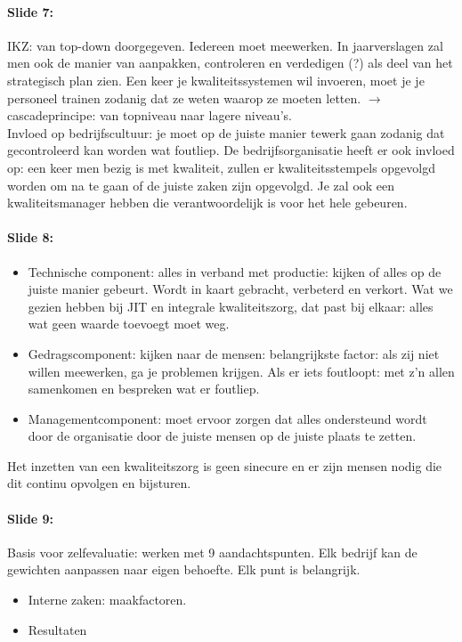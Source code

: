 \documentclass[10pt,a4paper]{report}
\begin{document}
\paragraph{Slide 7:} IKZ: van top-down doorgegeven. Iedereen moet meewerken. In jaarverslagen zal men ook de manier van aanpakken, controleren en verdedigen (?) als deel van het strategisch plan zien.
Een keer je kwaliteitssystemen wil invoeren, moet je je personeel trainen zodanig dat ze weten waarop ze moeten letten. $\rightarrow$ cascadeprincipe: van topniveau naar lagere niveau's.\\
Invloed op bedrijfscultuur: je moet op de juiste manier tewerk gaan zodanig dat gecontroleerd kan worden wat foutliep. De bedrijfsorganisatie heeft er ook invloed op: een keer men bezig is met kwaliteit, zullen er kwaliteitsstempels opgevolgd worden om na te gaan of de juiste zaken zijn opgevolgd. Je zal ook een kwaliteitsmanager hebben die verantwoordelijk is voor het hele gebeuren.

\paragraph{Slide 8:}
\begin{itemize}
\item Technische component: alles in verband met productie: kijken of alles op de juiste manier gebeurt. Wordt in kaart gebracht, verbeterd en verkort. Wat we gezien hebben bij JIT en integrale kwaliteitszorg, dat past bij elkaar: alles wat geen waarde toevoegt moet weg.
\item Gedragscomponent: kijken naar de mensen: belangrijkste factor: als zij niet willen meewerken, ga je problemen krijgen. Als er iets foutloopt: met z'n allen samenkomen en bespreken wat er foutliep.
\item Managementcomponent: moet ervoor zorgen dat alles ondersteund wordt door de organisatie door de juiste mensen op de juiste plaats te zetten.
\end{itemize}
Het inzetten van een kwaliteitszorg is geen sinecure en er zijn mensen nodig die dit continu opvolgen en bijsturen.

\paragraph{Slide 9:} Basis voor zelfevaluatie: werken met 9 aandachtspunten. Elk bedrijf kan de gewichten aanpassen naar eigen behoefte. Elk punt is belangrijk.
\begin{itemize}
\item Interne zaken: maakfactoren. 
\item Resultaten
\end{itemize}
\end{document}
